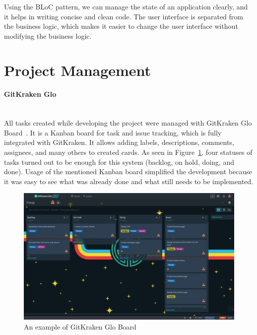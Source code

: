Using the BLoC pattern, we can manage the state of an application clearly, and it helps in writing concise and clean code. The user interface is separated from the business logic, which makes it easier to change the user interface without modifying the business logic.

\section{Project Management}
\paragraph{\large{GitKraken Glo}}\mbox{}\\[2pt]
All tasks created while developing the project were managed with GitKraken Glo Board~\cite{gitkraken-glo}. It is a Kanban board for task and issue tracking, which is fully integrated with GitKraken. It allows adding labels, descriptions, comments, assignees, and many others to created cards. As seen in Figure~\ref{fig:glo-board}, four statuses of tasks turned out to be enough for this system (backlog, on hold, doing, and done). Usage of the mentioned Kanban board simplified the development because it was easy to see what was already done and what still needs to be implemented.

\begin{figure}[htb]
    \centering
    \includegraphics[width=.98\textwidth]{fig04/glo_board.png}
    \caption{An example of GitKraken Glo Board} \label{fig:glo-board}
\end{figure}

